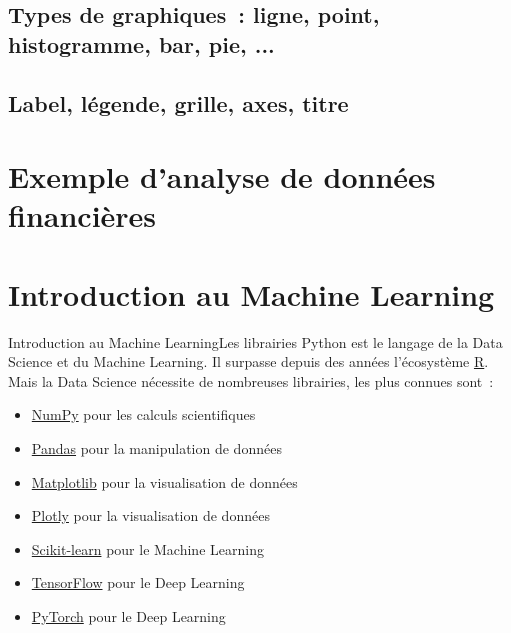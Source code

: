 \documentclass{beamer}
\begin{document}
    \subsection{Types de graphiques~: ligne, point, histogramme, bar, pie, ...}

    \subsection{Label, légende, grille, axes, titre}


    \section{Exemple d'analyse de données financières}


    \section{Introduction au Machine Learning}\label{sec:ml}
    \begin{frame}{Introduction au Machine Learning}{Les librairies}
        Python est le langage de la Data Science et du Machine Learning.
        Il surpasse depuis des années l'écosystème \href{https://posit.co/download/rstudio-desktop/}{R}.
        \bigbreak
        Mais la Data Science nécessite de nombreuses librairies, les plus connues sont~:
        \begin{itemize}
            \item \href{https://numpy.org/}{NumPy} pour les calculs scientifiques
            \item \href{https://pandas.pydata.org/}{Pandas} pour la manipulation de données
            \item \href{https://matplotlib.org/}{Matplotlib} pour la visualisation de données
            \item \href{https://plotly.com/}{Plotly} pour la visualisation de données
            \item \href{https://scikit-learn.org/stable/}{Scikit-learn} pour le Machine Learning
            \item \href{https://www.tensorflow.org/}{TensorFlow} pour le Deep Learning
            \item \href{https://pytorch.org/}{PyTorch} pour le Deep Learning
        \end{itemize}
    \end{frame}
\end{document}
